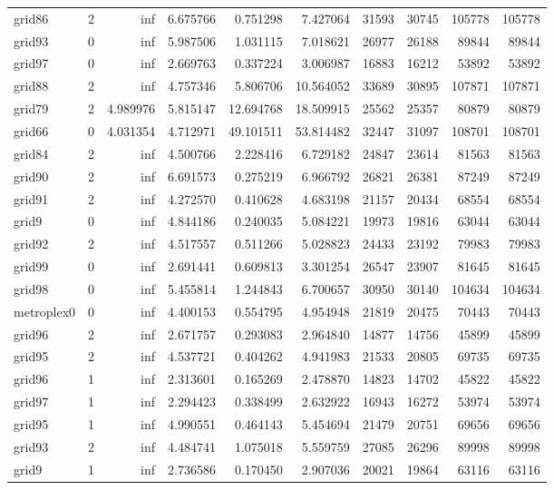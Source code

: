 \begin{longtable}{|l|r|r|r|r|r|r|r|r|r|}
grid86 & 2 & inf & 6.675766 & 0.751298 & 7.427064 & 31593 & 30745 & 105778 & 105778 \\
grid93 & 0 & inf & 5.987506 & 1.031115 & 7.018621 & 26977 & 26188 & 89844 & 89844 \\
grid97 & 0 & inf & 2.669763 & 0.337224 & 3.006987 & 16883 & 16212 & 53892 & 53892 \\
grid88 & 2 & inf & 4.757346 & 5.806706 & 10.564052 & 33689 & 30895 & 107871 & 107871 \\
grid79 & 2 & 4.989976 & 5.815147 & 12.694768 & 18.509915 & 25562 & 25357 & 80879 & 80879 \\
grid66 & 0 & 4.031354 & 4.712971 & 49.101511 & 53.814482 & 32447 & 31097 & 108701 & 108701 \\
grid84 & 2 & inf & 4.500766 & 2.228416 & 6.729182 & 24847 & 23614 & 81563 & 81563 \\
grid90 & 2 & inf & 6.691573 & 0.275219 & 6.966792 & 26821 & 26381 & 87249 & 87249 \\
grid91 & 2 & inf & 4.272570 & 0.410628 & 4.683198 & 21157 & 20434 & 68554 & 68554 \\
grid9 & 0 & inf & 4.844186 & 0.240035 & 5.084221 & 19973 & 19816 & 63044 & 63044 \\
grid92 & 2 & inf & 4.517557 & 0.511266 & 5.028823 & 24433 & 23192 & 79983 & 79983 \\
grid99 & 0 & inf & 2.691441 & 0.609813 & 3.301254 & 26547 & 23907 & 81645 & 81645 \\
grid98 & 0 & inf & 5.455814 & 1.244843 & 6.700657 & 30950 & 30140 & 104634 & 104634 \\
metroplex0 & 0 & inf & 4.400153 & 0.554795 & 4.954948 & 21819 & 20475 & 70443 & 70443 \\
grid96 & 2 & inf & 2.671757 & 0.293083 & 2.964840 & 14877 & 14756 & 45899 & 45899 \\
grid95 & 2 & inf & 4.537721 & 0.404262 & 4.941983 & 21533 & 20805 & 69735 & 69735 \\
grid96 & 1 & inf & 2.313601 & 0.165269 & 2.478870 & 14823 & 14702 & 45822 & 45822 \\
grid97 & 1 & inf & 2.294423 & 0.338499 & 2.632922 & 16943 & 16272 & 53974 & 53974 \\
grid95 & 1 & inf & 4.990551 & 0.464143 & 5.454694 & 21479 & 20751 & 69656 & 69656 \\
grid93 & 2 & inf & 4.484741 & 1.075018 & 5.559759 & 27085 & 26296 & 89998 & 89998 \\
grid9 & 1 & inf & 2.736586 & 0.170450 & 2.907036 & 20021 & 19864 & 63116 & 63116 \\

\end{longtable}
